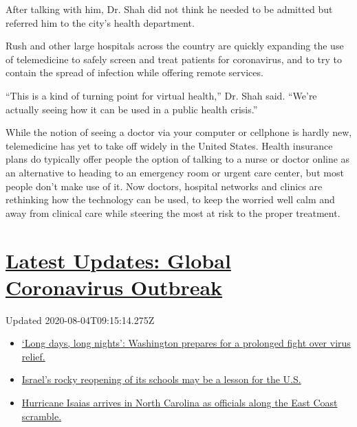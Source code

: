 After talking with him, Dr. Shah did not think he needed to be admitted
but referred him to the city's health department.

Rush and other large hospitals across the country are quickly expanding
the use of telemedicine to safely screen and treat patients for
coronavirus, and to try to contain the spread of infection while
offering remote services.

``This is a kind of turning point for virtual health,'' Dr. Shah said.
``We're actually seeing how it can be used in a public health crisis.''

While the notion of seeing a doctor via your computer or cellphone is
hardly new, telemedicine has yet to take off widely in the United
States. Health insurance plans do typically offer people the option of
talking to a nurse or doctor online as an alternative to heading to an
emergency room or urgent care center, but most people don't make use of
it. Now doctors, hospital networks and clinics are rethinking how the
technology can be used, to keep the worried well calm and away from
clinical care while steering the most at risk to the proper treatment.

\hypertarget{latest-updates-global-coronavirus-outbreak}{%
\section{\texorpdfstring{\href{https://www.nytimes.com/2020/08/04/world/coronavirus-covid-19.html?action=click\&pgtype=Article\&state=default\&region=MAIN_CONTENT_1\&context=storylines_live_updates}{Latest
Updates: Global Coronavirus
Outbreak}}{Latest Updates: Global Coronavirus Outbreak}}\label{latest-updates-global-coronavirus-outbreak}}

Updated 2020-08-04T09:15:14.275Z

\begin{itemize}
\tightlist
\item
  \href{https://www.nytimes.com/2020/08/04/world/coronavirus-covid-19.html?action=click\&pgtype=Article\&state=default\&region=MAIN_CONTENT_1\&context=storylines_live_updates\#link-6b644638}{`Long
  days, long nights': Washington prepares for a prolonged fight over
  virus relief.}
\item
  \href{https://www.nytimes.com/2020/08/04/world/coronavirus-covid-19.html?action=click\&pgtype=Article\&state=default\&region=MAIN_CONTENT_1\&context=storylines_live_updates\#link-7af9fca0}{Israel's
  rocky reopening of its schools may be a lesson for the U.S.}
\item
  \href{https://www.nytimes.com/2020/08/04/world/coronavirus-covid-19.html?action=click\&pgtype=Article\&state=default\&region=MAIN_CONTENT_1\&context=storylines_live_updates\#link-33bf9168}{Hurricane
  Isaias arrives in North Carolina as officials along the East Coast
  scramble.}
\end{itemize}

